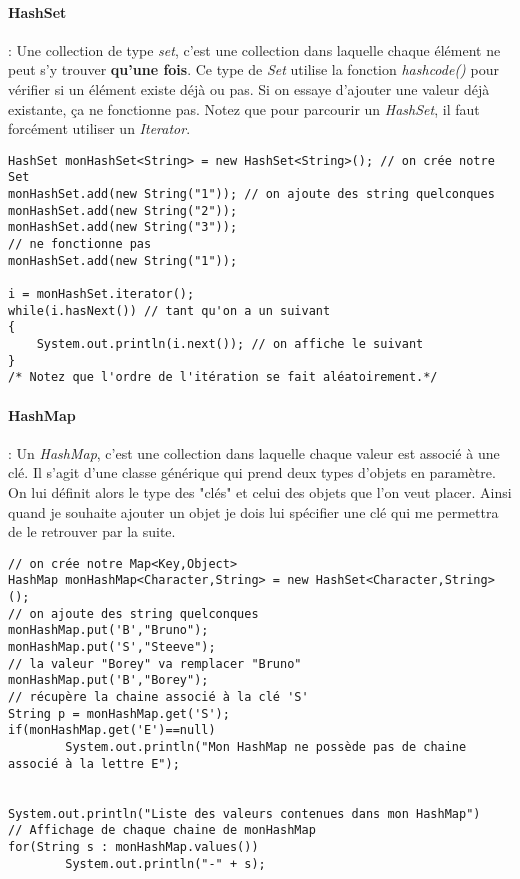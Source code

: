 \documentclass{article}
\begin{document}
\paragraph{HashSet} : Une collection de type \emph{set}, c'est une collection dans laquelle chaque élément ne peut s'y trouver \textbf{qu'une fois}. Ce type de \emph{Set} utilise la fonction \emph{hashcode()} pour vérifier si un élément existe déjà ou pas. Si on essaye d'ajouter une valeur déjà existante, ça ne fonctionne pas.
Notez que pour parcourir un \emph{HashSet}, il faut forcément utiliser un \emph{Iterator}.
\begin{lstlisting}
HashSet monHashSet<String> = new HashSet<String>(); // on crée notre Set
monHashSet.add(new String("1")); // on ajoute des string quelconques
monHashSet.add(new String("2"));
monHashSet.add(new String("3"));
// ne fonctionne pas
monHashSet.add(new String("1"));

i = monHashSet.iterator();
while(i.hasNext()) // tant qu'on a un suivant
{
	System.out.println(i.next()); // on affiche le suivant
}
/* Notez que l'ordre de l'itération se fait aléatoirement.*/	
\end{lstlisting}

\paragraph{HashMap} : Un \emph{HashMap}, c'est une collection dans laquelle chaque valeur est associé à une clé. Il s'agit d'une classe générique qui prend deux types d'objets en paramètre. On lui définit alors le type des "clés" et celui des objets que l'on veut placer. Ainsi quand je souhaite ajouter un objet je dois lui spécifier une clé qui me permettra de le retrouver par la suite.
 
\begin{lstlisting}
// on crée notre Map<Key,Object>
HashMap monHashMap<Character,String> = new HashSet<Character,String>(); 
// on ajoute des string quelconques
monHashMap.put('B',"Bruno"); 
monHashMap.put('S',"Steeve");
// la valeur "Borey" va remplacer "Bruno"
monHashMap.put('B',"Borey");
// récupère la chaine associé à la clé 'S'
String p = monHashMap.get('S'); 
if(monHashMap.get('E')==null)
        System.out.println("Mon HashMap ne possède pas de chaine associé à la lettre E");
 
 
System.out.println("Liste des valeurs contenues dans mon HashMap")
// Affichage de chaque chaine de monHashMap
for(String s : monHashMap.values())
        System.out.println("-" + s); 
 
\end{lstlisting}
\end{document}
